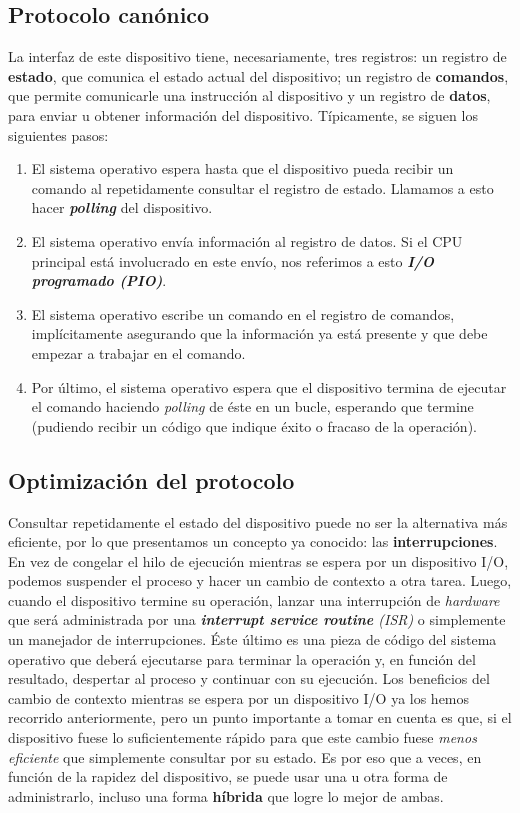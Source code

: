 \documentclass{article}
\begin{document}
	\subsection{Protocolo canónico}
	La interfaz de este dispositivo tiene, necesariamente, tres registros: un registro de \textbf{estado}, que comunica el estado actual del dispositivo; un registro de \textbf{comandos}, que permite comunicarle una instrucción al dispositivo y un registro de \textbf{datos}, para enviar u obtener información del dispositivo. Típicamente, se siguen los siguientes pasos:
	
	\begin{enumerate}
		\item El sistema operativo espera hasta que el dispositivo pueda recibir un comando al repetidamente consultar el registro de estado. Llamamos a esto hacer \textit{\textbf{polling}} del dispositivo.
		\item El sistema operativo envía información al registro de datos. Si el CPU principal está involucrado en este envío, nos referimos a esto \textit{\textbf{I/O programado (PIO)}}.
		\item El sistema operativo escribe un comando en el registro de comandos, implícitamente asegurando que la información ya está presente y que debe empezar a trabajar en el comando.
		\item Por último, el sistema operativo espera que el dispositivo termina de ejecutar el comando haciendo \textit{polling} de éste en un bucle, esperando que termine (pudiendo recibir un código que indique éxito o fracaso de la operación).
	\end{enumerate}
	
	\subsection{Optimización del protocolo}
	Consultar repetidamente el estado del dispositivo puede no ser la alternativa más eficiente, por lo que presentamos un concepto ya conocido: las \textbf{interrupciones}. En vez de congelar el hilo de ejecución mientras se espera por un dispositivo I/O, podemos suspender el proceso y hacer un cambio de contexto a otra tarea. Luego, cuando el dispositivo termine su operación, lanzar una interrupción de \textit{hardware} que será administrada por una \textit{\textbf{interrupt service routine} (ISR)} o simplemente un manejador de interrupciones. Éste último es una pieza de código del sistema operativo que deberá ejecutarse para terminar la operación y, en función del resultado, despertar al proceso y continuar con su ejecución. Los beneficios del cambio de contexto mientras se espera por un dispositivo I/O ya los hemos recorrido anteriormente, pero un punto importante a tomar en cuenta es que, si el dispositivo fuese lo suficientemente rápido para que este cambio fuese \textit{menos eficiente} que simplemente consultar por su estado. Es por eso que a veces, en función de la rapidez del dispositivo, se puede usar una u otra forma de administrarlo, incluso una forma \textbf{híbrida} que logre lo mejor de ambas.
	
\end{document}
